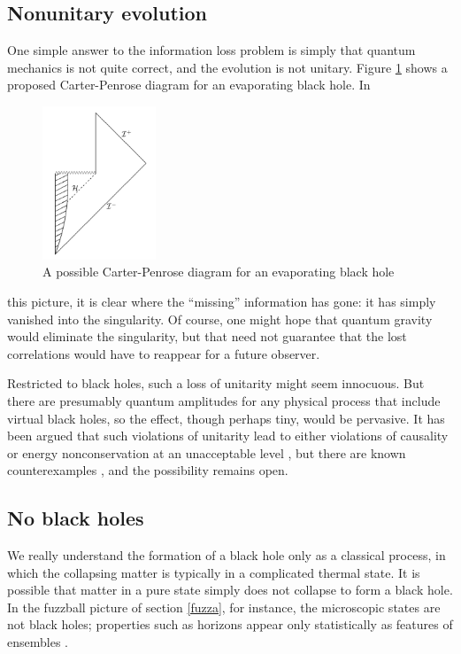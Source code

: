 \documentclass[12pt]{article}
\begin{document}
\subsection{Nonunitary evolution}

One simple answer to the information loss problem is simply that 
quantum mechanics is not quite correct, and the evolution is not
unitary.  Figure \ref{Carlipfig5} shows a proposed Carter-Penrose
diagram for an evaporating black hole.  In
\begin{figure}
\centerline{\includegraphics[height=1.8in]{evapbh.pdf}}
\caption{A possible Carter-Penrose diagram for an evaporating black
hole}
\label{Carlipfig5}
\end{figure}
this picture, it is clear where the ``missing'' information has 
gone: it has simply vanished into the singularity.  
Of course, one might hope that quantum gravity would eliminate the
singularity, but that need not guarantee that the lost correlations 
would have to reappear for a future observer.

Restricted to black holes, such a loss of unitarity might seem
innocuous.  But there are presumably quantum amplitudes for any
physical process that include virtual black holes, so the effect,
though perhaps tiny, would be pervasive.  It has been argued that 
such violations of unitarity lead to either violations of causality or 
energy nonconservation at an unacceptable level \cite{Banks}, 
but there are known counterexamples \cite{UnruhWald}, and the 
possibility remains open.

\subsection{No black holes}

We really understand the formation of a black hole only as a 
classical process, in which the collapsing matter is typically in 
a complicated thermal state.  It is possible that matter in a pure
state simply does not collapse to form a black hole.  In the
fuzzball picture of section \ref{fuzza}, for instance, the
microscopic states are not black holes; properties such as
horizons appear only statistically as features of ensembles
\cite{Mathurc}.
\end{document}
